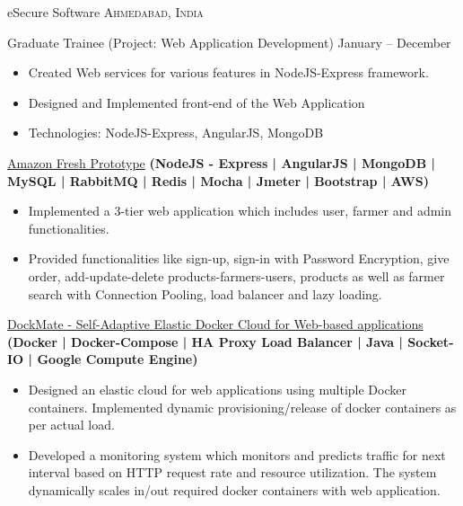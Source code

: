 \documentclass[10pt,a4paper]{article}
\begin{document}
{{{\headedsection  %
  {eSecure Software}
  {\textsc{Ahmedabad, India}} {%
  \headedsubsection
    {Graduate Trainee (Project: Web Application Development)}
    {January  -- December }
    {\bodytext
    {
    \begin{itemize}
        \item Created Web services for various features in NodeJS-Express framework.
        \item Designed and Implemented front-end of the Web Application
        \item Technologies: NodeJS-Express, AngularJS, MongoDB
    \end{itemize}}}
}

\spacedhrule{0.0em}{-0.4em}








\headedsection  %
  {\href{https://github.com/darshilsaraiya/Amazon}{Amazon Fresh Prototype}
  \textbf{
  \small{(NodeJS - Express | AngularJS | MongoDB | MySQL | RabbitMQ | Redis | Mocha | Jmeter | Bootstrap | AWS)}}}
  {} {%
  
    {\bodytext
    {
    \begin{itemize}
        \item Implemented a 3-tier web application which includes user, farmer and admin functionalities.
        \item Provided functionalities like sign-up, sign-in with Password Encryption, give order, add-update-delete products-farmers-users, products as well as farmer search with Connection Pooling, load balancer and lazy loading.
    \end{itemize}}}
}

\headedsection  %
  {\href{https://github.com/darshilsaraiya/dockmate}{DockMate - Self-Adaptive Elastic Docker Cloud for Web-based applications}
  \textbf{
  \small{(Docker | Docker-Compose | HA Proxy Load Balancer | Java | Socket-IO | Google Compute Engine)}}}
  {} {%
  
    {\bodytext
    {
    \begin{itemize}
        \item Designed an elastic cloud for web applications using multiple Docker containers. Implemented dynamic provisioning/release of docker containers as per actual load.
        \item Developed a monitoring system which monitors and predicts traffic for next interval based on HTTP request rate and resource utilization. The system dynamically scales in/out required docker containers with web application.
    \end{itemize}}}
}


}}}
\end{document}

